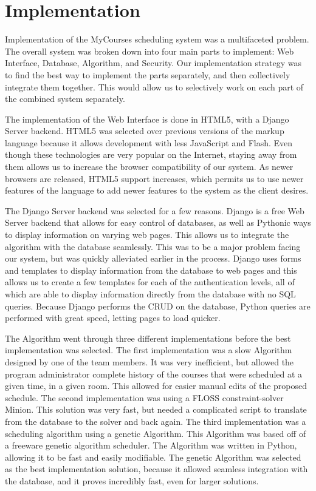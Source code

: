 \documentclass[12pt,article]{memoir}
\begin{document}
\chapter{Implementation} %

Implementation of the MyCourses scheduling system was a multifaceted problem. The overall system was broken down into four main parts to implement: Web Interface, Database, Algorithm, and Security. Our implementation strategy was to find the best way to implement the parts separately, and then collectively integrate them together. This would allow us to selectively work on each part of the combined system separately.

The implementation of the Web Interface is done in HTML5, with a Django Server backend. HTML5 was selected over previous versions of the markup language because it allows development with less JavaScript and Flash. Even though these technologies are very popular on the Internet, staying away from them allows us to increase the browser compatibility of our system. As newer browsers are released, HTML5 support increases, which permits us to use newer features of the language to add newer features to the system as the client desires. 

The Django Server backend was selected for a few reasons. Django is a free Web Server backend that allows for easy control of databases, as well as Pythonic ways to display information on varying web pages. This allows us to integrate the algorithm with the database seamlessly. This was to be a major problem facing our system, but was quickly alleviated earlier in the process. Django uses forms and templates to display information from the database to web pages and this allows us to create a few templates for each of the authentication levels, all of which are able to display information directly from the database with no SQL queries. Because Django performs the CRUD on the database, Python queries are performed with great speed, letting pages to load quicker.

The Algorithm went through three different implementations before the best implementation was selected. The first implementation was a slow Algorithm designed by one of the team members. It was very inefficient, but allowed the program administrator complete history of the courses that were scheduled at a given time, in a given room. This allowed for easier manual edits of the proposed schedule. The second implementation was using a FLOSS constraint-solver Minion. This solution was very fast, but needed a complicated script to translate from the database to the solver and back again. The third implementation was a scheduling algorithm using a genetic Algorithm. This Algorithm was based off of a freeware genetic algorithm scheduler. The Algorithm was written in Python, allowing it to be fast and easily modifiable. The genetic Algorithm was selected as the best implementation solution, because it allowed seamless integration with the database, and it proves incredibly fast, even for larger solutions.
\end{document}
